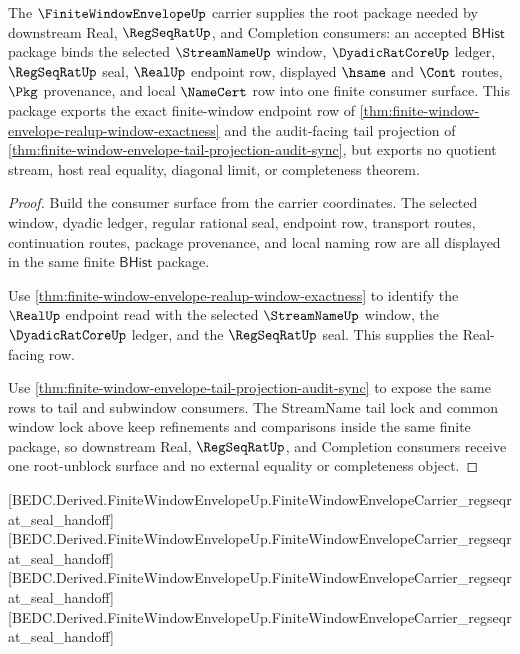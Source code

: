\begin{theorem}
\label{thm:finite-window-envelope-real-seal-root-unblock}
The $\FiniteWindowEnvelopeUp$ carrier supplies the root package needed by downstream Real, $\RegSeqRatUp$, and Completion consumers: an accepted $\mathsf{BHist}$ package binds the selected $\StreamNameUp$ window, $\DyadicRatCoreUp$ ledger, $\RegSeqRatUp$ seal, $\RealUp$ endpoint row, displayed $\hsame$ and $\Cont$ routes, $\Pkg$ provenance, and local $\NameCert$ row into one finite consumer surface. This package exports the exact finite-window endpoint row of \autoref{thm:finite-window-envelope-realup-window-exactness} and the audit-facing tail projection of \autoref{thm:finite-window-envelope-tail-projection-audit-sync}, but exports no quotient stream, host real equality, diagonal limit, or completeness theorem.
\end{theorem}
\begin{proof}
Build the consumer surface from the carrier coordinates. The selected window, dyadic ledger, regular rational seal, endpoint row, transport routes, continuation routes, package provenance, and local naming row are all displayed in the same finite $\mathsf{BHist}$ package.

Use \autoref{thm:finite-window-envelope-realup-window-exactness} to identify the $\RealUp$ endpoint read with the selected $\StreamNameUp$ window, the $\DyadicRatCoreUp$ ledger, and the $\RegSeqRatUp$ seal. This supplies the Real-facing row.

Use \autoref{thm:finite-window-envelope-tail-projection-audit-sync} to expose the same rows to tail and subwindow consumers. The StreamName tail lock and common window lock above keep refinements and comparisons inside the same finite package, so downstream Real, $\RegSeqRatUp$, and Completion consumers receive one root-unblock surface and no external equality or completeness object.
\end{proof}

[BEDC.Derived.FiniteWindowEnvelopeUp.FiniteWindowEnvelopeCarrier\_regseqrat\_seal\_handoff]
[BEDC.Derived.FiniteWindowEnvelopeUp.FiniteWindowEnvelopeCarrier\_regseqrat\_seal\_handoff]
[BEDC.Derived.FiniteWindowEnvelopeUp.FiniteWindowEnvelopeCarrier\_regseqrat\_seal\_handoff]
[BEDC.Derived.FiniteWindowEnvelopeUp.FiniteWindowEnvelopeCarrier\_regseqrat\_seal\_handoff]

